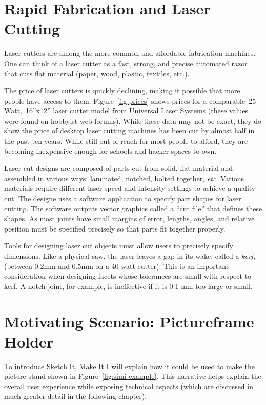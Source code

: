\section{Rapid Fabrication and Laser Cutting}

Laser cutters are among the more common and affordable fabrication
machines. One can think of a laser cutter as a fast, strong, and
precise automated razor that cuts flat material (paper, wood, plastic,
textiles, etc.). 



The price of laser cutters is quickly declining, making it possible
that more people have access to them. Figure~\ref{fig:prices} shows
prices for a comparable~25-Watt,~16''x12'' laser cutter model from
Universal Laser Systems (these values were found on hobbyist web
forums). While these data may not be exact, they do show the price of
desktop laser cutting machines has been cut by almost half in the past
ten years. While still out of reach for most people to afford, they
are becoming inexpensive enough for schools and hacker spaces to own.

Laser cut designs are composed of parts cut from solid, flat material
and assembled in various ways: laminated, notched, bolted together,
\textit{etc}. Various materials require different laser speed and
intensity settings to achieve a quality cut. The designe uses a
software application to specify part shapes for laser cutting. The
software outputs vector graphics called a ``cut file'' that defines
these shapes. As most joints have small margins of error, lengths,
angles, and relative position must be specified precisely so that
parts fit together properly.

Tools for designing laser cut objects must allow users to precisely
specify dimensions. Like a physical saw, the laser leaves a gap in its
wake, called a \textit{kerf}, (between 0.2mm and 0.5mm on a 40 watt
cutter). This is an important consideration when designing facets
whose tolerances are small with respect to kerf. A notch joint, for
example, is ineffective if it is 0.1 mm too large or small.


\section{Motivating Scenario: Pictureframe Holder}



To introduce Sketch It, Make It I will explain how it could be used to
make the picture stand shown in Figure~\ref{fig:simi-example}. This
narrative helps explain the overall user experience while exposing
technical aspects (which are discussed in much greater detail in the
following chapter).

